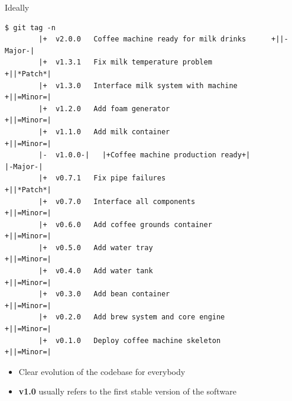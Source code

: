 \documentclass[usenames,svgnames,14pt]{beamer}
\begin{document}
\begin{frame}[fragile]{Ideally}
    \vspace{-2mm}
    \begin{lstlisting}[style=MyBash]
        $ git tag -n
        |+  v2.0.0   Coffee machine ready for milk drinks      +||-Major-|
        |+  v1.3.1   Fix milk temperature problem              +||*Patch*|
        |+  v1.3.0   Interface milk system with machine        +||=Minor=|
        |+  v1.2.0   Add foam generator                        +||=Minor=|
        |+  v1.1.0   Add milk container                        +||=Minor=|
        |-  v1.0.0-|   |+Coffee machine production ready+|           |-Major-|
        |+  v0.7.1   Fix pipe failures                         +||*Patch*|
        |+  v0.7.0   Interface all components                  +||=Minor=|
        |+  v0.6.0   Add coffee grounds container              +||=Minor=|
        |+  v0.5.0   Add water tray                            +||=Minor=|
        |+  v0.4.0   Add water tank                            +||=Minor=|
        |+  v0.3.0   Add bean container                        +||=Minor=|
        |+  v0.2.0   Add brew system and core engine           +||=Minor=|
        |+  v0.1.0   Deploy coffee machine skeleton            +||=Minor=|
    \end{lstlisting}
    \begin{itemize}
        \item Clear evolution of the codebase for everybody
        \item \textbf{v1.0} usually refers to the first stable version of the software
    \end{itemize}
\end{frame}


\end{document}
